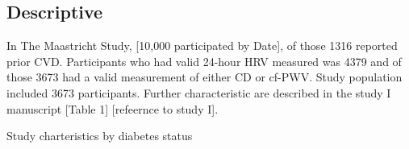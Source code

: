 \documentclass[
  a4paper,
  headsepline=true,
  open=any]{scrbook}
\begin{document}
\hypertarget{descriptive}{%
\subsection{Descriptive}\label{descriptive}}

In The Maastricht Study, {[}10,000 participated by Date{]}, of those
1316 reported prior CVD. Participants who had valid 24-hour HRV measured
was 4379 and of those 3673 had a valid measurement of either CD or
cf-PWV. Study population included 3673 participants. Further
characteristic are described in the study I manuscript {[}Table 1{]}
{[}refeernce to study I{]}.

\hypertarget{tbl-ms}{}
\begin{table}
\caption{\label{tbl-ms}Study charteristics by diabetes status }\tabularnewline


\end{table}
\end{document}
